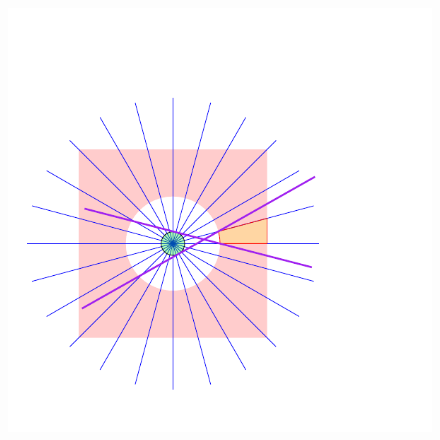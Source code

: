 \documentclass[12pt]{article}%
\begin{document}
\begin{figure}[ht]
    \centerline{\includegraphics{figs/partition}}
    \caption{}
\end{figure}
\end{document}
